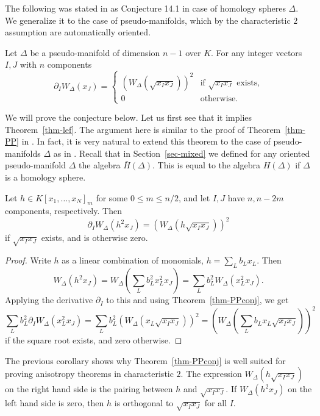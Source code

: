 The following was stated in \cite{PapadakisPetrotou} as Conjecture 14.1 in case of homology spheres $\Delta$. We generalize it to the case of pseudo-manifolds, which by the characteristic $2$ assumption are automatically oriented.

\begin{theorem} \label{thm-PPconj}
Let $\Delta$ be a  pseudo-manifold of dimension $n-1$ over $K$. For any integer vectors $I, J$ with $n$ components
\[ \partial_I W_\Delta(x_J) = \begin{cases} 
(W_\Delta (\sqrt{x_I x_J}))^2 & \text{if $\sqrt{x_I x_J}$ exists,} \\
0 & \text{otherwise.}
\end{cases}
\]
\end{theorem}

We will prove the conjecture below. Let us first see that it implies Theorem~\ref{thm-lef}. The argument here is similar to the proof of Theorem~\ref{thm-PP} in \cite{PapadakisPetrotou}. In fact, it is very natural to extend this theorem to the case of pseudo-manifolds $\Delta$ as in \cite{APP}. Recall that in Section~\ref{sec-mixed} we defined for any oriented pseudo-manifold $\Delta$ the algebra $\bar{H}(\Delta)$. This is equal to the algebra $H(\Delta)$ if $\Delta$ is a homology sphere.

\begin{coro} \label{cor-PPconj}
Let $h \in K[x_1,\ldots, x_N]_m$ for  some $0 \leq m \leq n/2$, and let $I, J$ have $n, n - 2m$ components, respectively. Then
\[ \partial_I W_\Delta(h^2 x_J) = (W_\Delta(h \sqrt{x_I x_J}))^2 \]
if $\sqrt{x_I x_J}$ exists, and is otherwise zero.
\end{coro}

\begin{proof}
Write $h$ as a linear combination of monomials, $h=\sum_L b_L x_L$. Then
\[ W_\Delta(h^2 x_J) = W_\Delta ( \sum_L b_L^2 x_L^2 x_J) = \sum_L b_L^2 W_\Delta (x_L^2 x_J).\]
Applying the derivative $\partial_I$ to this and using  Theorem~\ref{thm-PPconj}, we get
\[  \sum_L b_L^2 \partial_I W_\Delta (x_L^2 x_J) = \sum_L b_L^2 (W_\Delta (x_L \sqrt{x_I x_J}))^2 = (W_\Delta ( \sum_L b_L x_L \sqrt{x_I x_J}))^2\]
if the square root exists, and zero otherwise.
\end{proof}

The previous corollary shows why Theorem~\ref{thm-PPconj} is well suited for proving anisotropy theorems in characteristic $2$. The expression $W_\Delta(h \sqrt{x_I x_J})$ on the right hand side is the \Po pairing between $h$ and $\sqrt{x_I x_J}$. If $W_\Delta(h^2 x_J)$ on the left hand side is zero, then $h$ is orthogonal to $\sqrt{x_I x_J}$ for all $I$.

